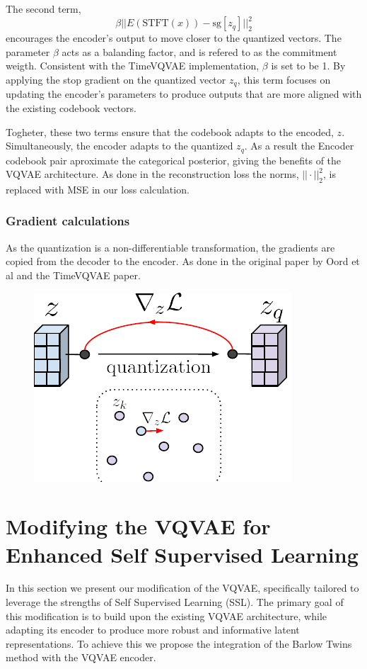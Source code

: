 The second term,
\begin{equation}
    \beta|| E(\text{STFT}(x)) - \text{sg}\left[ z_q \right]||_2^2
\end{equation}
encourages the encoder's output to move closer to the quantized vectors. The parameter $\beta$ acts as a balanding factor, and is refered to as the commitment weigth. Consistent with the TimeVQVAE implementation, $\beta$ is set to be 1.
By applying the stop gradient on the quantized vector $z_q$, this term focuses on updating the encoder's parameters to produce outputs that are more aligned with the existing
codebook vectors.

Togheter, these two terms ensure that the codebook adapts to the encoded, $z$. Simultaneously, the encoder adapts to the quantized $z_q$. As a result the Encoder codebook pair aproximate the categorical posterior, giving the benefits of the VQVAE architecture.
As done in the reconstruction loss the norms, $||\cdot||_2^2$, is replaced with MSE in our loss calculation.

\subsubsection{Gradient calculations}
As the quantization is a non-differentiable transformation, the gradients are copied from the decoder to the encoder. As done in the original paper by Oord et al\cite{neuvqvae} and the TimeVQVAE paper\cite{lee2023masked}.

\begin{figure}
    \includegraphics{figures/figure-pdf/gradients.pdf}
\end{figure}

\section{Modifying the VQVAE for Enhanced Self Supervised Learning}
In this section we present our modification of the VQVAE, specifically tailored to leverage the strengths of Self Supervised Learning (SSL).
The primary goal of this modification is to build upon the existing VQVAE architecture, while adapting its encoder to produce more robust and informative latent representations.
To achieve this we propose the integration of the Barlow Twins method with the VQVAE encoder.


